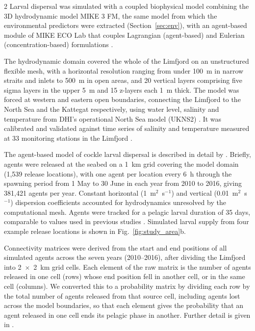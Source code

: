 \begin{spacing}{2}
Larval dispersal was simulated with a coupled biophysical model combining the 3D hydrodynamic model MIKE 3 FM, the same model from which the environmental predictors were extracted (Section~\ref{sec:env}), with an agent-based module of MIKE ECO Lab that couples Lagrangian (agent-based) and Eulerian (concentration-based) formulations \citep{DHI2025_ECOLab}.

The hydrodynamic domain covered the whole of the Limfjord on an unstructured flexible mesh, with a horizontal resolution ranging from under 100~m in narrow straits and inlets to 500~m in open areas, and 20 vertical layers comprising five sigma layers in the upper 5~m and 15 z-layers each 1~m thick. The model was forced at western and eastern open boundaries, connecting the Limfjord to the North Sea and the Kattegat respectively, using water level, salinity and temperature from DHI's operational North Sea model (UKNS2) \citep{DHI2019NorthSea}. It was calibrated and validated against time series of salinity and temperature measured at 33 monitoring stations in the Limfjord \citep{erichsen2019limfjorden}. 

The agent-based model of cockle larval dispersal is described in detail by \citet{hansenAssessingDemographicConnectivity2024}. Briefly, agents were released at the seabed on a 1~km grid covering the model domain (1{,}539 release locations), with one agent per location every 6~h through the spawning period from 1 May to 30 June in each year from 2010 to 2016, giving 381{,}421 agents per year. Constant horizontal (1~m$^2$~s$^{-1}$) and vertical (0.01~m$^2$~s$^{-1}$) dispersion coefficients accounted for hydrodynamics unresolved by the computational mesh. Agents were tracked for a pelagic larval duration of 35 days, comparable to values used in previous studies \citep[e.g.][]{cosciaFinescaleSeascapeGenomics2020}. Simulated larval supply from four example release locations is shown in Fig.~\ref{fig:study_area}b.

Connectivity matrices were derived from the start and end positions of all simulated agents across the seven years (2010--2016), after dividing the Limfjord into 2~$\times$~2~km grid cells. Each element of the raw matrix is the number of agents released in one cell (rows) whose end position fell in another cell, or in the same cell (columns). We converted this to a probability matrix by dividing each row by the total number of agents released from that source cell, including agents lost across the model boundaries, so that each element gives the probability that an agent released in one cell ends its pelagic phase in another.  Further detail is given in \citet{hansenAssessingDemographicConnectivity2024}.


\end{spacing}
